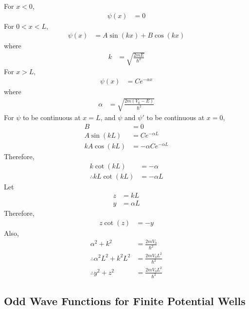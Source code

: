 \documentclass[titlepage, fleqn, a4paper, 12pt, twoside]{article}
\theoremstyle{definition}
\theoremstyle{theorem}
\let\Oldsubsection\subsection
\renewcommand{\subsection}{\FloatBarrier\Oldsubsection}
\begin{document}
\begin{solution}
	For $x < 0$,
	\begin{align*}
		\psi(x) &= 0
	\end{align*}
	For $0 < x < L$,
	\begin{align*}
		\psi(x) &= A \sin(k x) + B \cos(k x)
	\end{align*}
	where
	\begin{align*}
		k &= \sqrt{\frac{2 m E}{\hbar^2}}
	\end{align*}
	For $x > L$,
	\begin{align*}
		\psi(x) &= C e^{-\alpha x}
	\end{align*}
	where
	\begin{align*}
		\alpha &= \sqrt{\frac{2 m (V_0 - E)}{\hbar^2}}
	\end{align*}
	For $\psi$ to be continuous at $x = L$, and $\psi$ and $\psi'$ to be continuous at $x = 0$,
	\begin{align*}
		B &= 0\\
		A \sin(k L) &= C e^{-\alpha L}\\
		k A \cos(k L) &= -\alpha C e^{-\alpha L}
	\end{align*}
	Therefore,
	\begin{align*}
		k \cot(k L) &= -\alpha\\
		\therefore k L \cot(k L) &= -\alpha L
	\end{align*}
	Let
	\begin{align*}
		z &= k L\\
		y &= \alpha L
	\end{align*}
	Therefore,
	\begin{align*}
		z \cot(z) &= -y
	\end{align*}
	Also,
	\begin{align*}
		\alpha^2 + k^2 &= \frac{2 m V_0}{\hbar^2}\\
		\therefore \alpha^2 L^2 + k^2 L^2 &= \frac{2 m V_0 L^2}{\hbar^2}\\
		\therefore y^2 + z^2 &= \frac{2 m V_0 L^2}{\hbar^2}
	\end{align*}
\end{solution}

\subsection{Odd Wave Functions for Finite Potential Wells}
\end{document}
